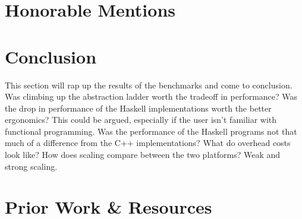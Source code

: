 \documentclass[a4paper, 10pt]{article}
\begin{document}
\section{Honorable Mentions}


\section{Conclusion}
This section will rap up the results of the benchmarks and come to conclusion. Was climbing up the
 abstraction ladder worth the tradeoff in performance? Was the drop in performance of the Haskell implementations
 worth the better ergonomics? This could be argued, especially if the user isn't familiar with functional programming.
 Was the performance of the Haskell programs not that much of a difference from the C++ implementations? What do overhead costs look like?
 How does scaling compare between the two platforms? Weak and strong scaling.

\section{Prior Work \& Resources}
\end{document}
